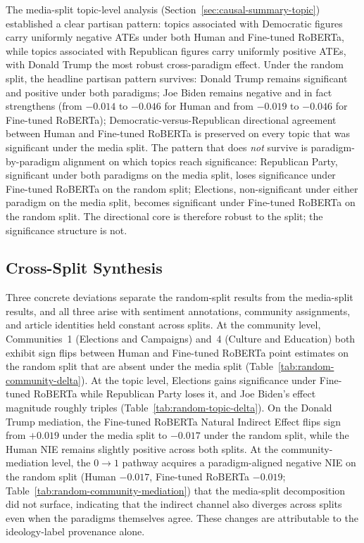The media-split topic-level analysis (Section~\ref{sec:causal-summary-topic}) established a clear partisan pattern: topics associated with Democratic figures carry uniformly negative ATEs under both Human and Fine-tuned RoBERTa, while topics associated with Republican figures carry uniformly positive ATEs, with Donald Trump the most robust cross-paradigm effect. Under the random split, the headline partisan pattern survives: Donald Trump remains significant and positive under both paradigms; Joe Biden remains negative and in fact strengthens (from $-0.014$ to $-0.046$ for Human and from $-0.019$ to $-0.046$ for Fine-tuned RoBERTa); Democratic-versus-Republican directional agreement between Human and Fine-tuned RoBERTa is preserved on every topic that was significant under the media split. The pattern that does \emph{not} survive is paradigm-by-paradigm alignment on which topics reach significance: Republican Party, significant under both paradigms on the media split, loses significance under Fine-tuned RoBERTa on the random split; Elections, non-significant under either paradigm on the media split, becomes significant under Fine-tuned RoBERTa on the random split. The directional core is therefore robust to the split; the significance structure is not.

\subsection{Cross-Split Synthesis}
\label{sec:cross-split-synthesis}

Three concrete deviations separate the random-split results from the media-split results, and all three arise with sentiment annotations, community assignments, and article identities held constant across splits. At the community level, Communities~1 (Elections and Campaigns) and~4 (Culture and Education) both exhibit sign flips between Human and Fine-tuned RoBERTa point estimates on the random split that are absent under the media split (Table~\ref{tab:random-community-delta}). At the topic level, Elections gains significance under Fine-tuned RoBERTa while Republican Party loses it, and Joe Biden's effect magnitude roughly triples (Table~\ref{tab:random-topic-delta}). On the Donald Trump mediation, the Fine-tuned RoBERTa Natural Indirect Effect flips sign from $+0.019$ under the media split to $-0.017$ under the random split, while the Human NIE remains slightly positive across both splits. At the community-mediation level, the $0 \to 1$ pathway acquires a paradigm-aligned negative NIE on the random split (Human $-0.017$, Fine-tuned RoBERTa $-0.019$; Table~\ref{tab:random-community-mediation}) that the media-split decomposition did not surface, indicating that the indirect channel also diverges across splits even when the paradigms themselves agree. These changes are attributable to the ideology-label provenance alone.

